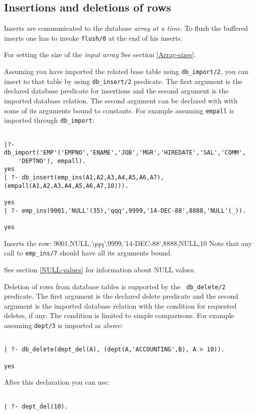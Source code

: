 \subsection{Insertions and deletions of rows}

Inserts are communicated to the database {\it array at a time}.
To flush the buffered inserts one has to invoke {\tt flush/0}
at the end of his inserts. 

For setting the size of the {\it input array} See section \ref{Array-sizes}.

Assuming you have imported the related base table using {\tt db\_import/2}, you can insert to
that table by using {\tt db\_insert/2} predicate.  The first argument is
the declared database predicate for insertions and the second argument
is the imported database relation.  The second argument can be declared with
with some of its arguments bound to constants.  For example assuming {\tt empall} is imported through {\tt db\_import}:
\begin{verbatim}

|?- db_import('EMP'('EMPNO','ENAME','JOB','MGR','HIREDATE','SAL','COMM',
	'DEPTNO'), empall).
yes 
| ?- db_insert(emp_ins(A1,A2,A3,A4,A5,A6,A7),(empall(A1,A2,A3,A4,A5,A6,A7,10))).

yes
| ?- emp_ins(9001,'NULL'(35),'qqq',9999,'14-DEC-88',8888,'NULL'(_)).

yes
\end{verbatim}
Inserts the row: 9001,NULL,'qqq',9999,'14-DEC-88',8888,NULL,10
Note that any call to {\tt emp\_ins/7} should have all its arguments bound.

See section \ref{NULL-values} for information about NULL values.

Deletion of rows from database tables is supported by the {\tt
db\_delete/2} predicate.  The first argument is the declared delete
predicate and the second argument is the imported database relation
with the condition for requested deletes, if any.  The condition is
limited to simple comparisons.  For example assuming
{\tt dept/3} is imported as above:
\begin{verbatim}

| ?- db_delete(dept_del(A), (dept(A,'ACCOUNTING',B), A > 10)). 

yes
\end{verbatim}

After this declaration you can use:
\begin{verbatim}

| ?- dept_del(10).
\end{verbatim}

